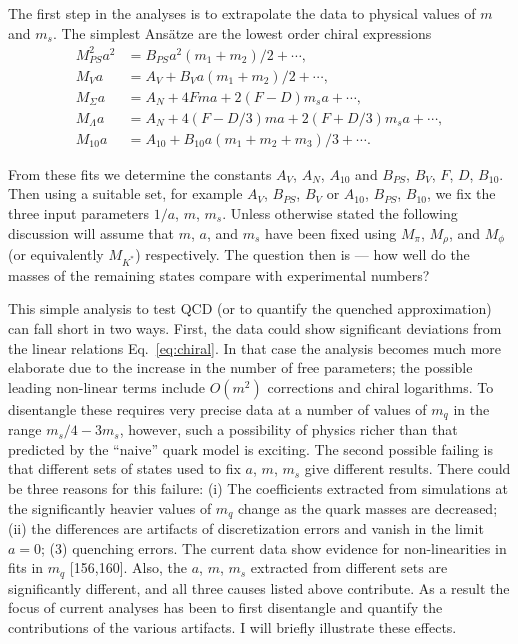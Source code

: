 The first step in the analyses is to extrapolate the data to physical values of $m$ and $m_s$. The simplest Ans\"atze are the lowest order chiral expressions
\begin{equation}
\begin{aligned}
M_{PS}^2 a^2 &= B_{PS} a^2 (m_1 + m_2)/2 + \cdots, \\
M_V a &= A_V + B_V a (m_1 + m_2)/2 + \cdots, \\
M_\Sigma a &= A_N + 4F m a + 2(F - D) m_s a + \cdots, \\
M_\Lambda a &= A_N + 4(F - D/3) m a + 2(F + D/3) m_s a + \cdots, \\
M_{10} a &= A_{10} + B_{10} a (m_1 + m_2 + m_3)/3 + \cdots.
\end{aligned}
\label{eq:chiral}
\end{equation}

From these fits we determine the constants $A_V$, $A_N$, $A_{10}$ and $B_{PS}$, $B_V$, $F$, $D$, $B_{10}$. Then using a suitable set, for example $A_V$, $B_{PS}$, $B_V$ or $A_{10}$, $B_{PS}$, $B_{10}$, we fix the three input parameters $1/a$, $m$, $m_s$. Unless otherwise stated the following discussion will assume that $m$, $a$, and $m_s$ have been fixed using $M_\pi$, $M_\rho$, and $M_\phi$ (or equivalently $M_{K^*}$) respectively. The question then is --- how well do the masses of the remaining states compare with experimental numbers?

This simple analysis to test QCD (or to quantify the quenched approximation) can fall short in two ways. First, the data could show significant deviations from the linear relations Eq.~\eqref{eq:chiral}. In that case the analysis becomes much more elaborate due to the increase in the number of free parameters; the possible leading non-linear terms include $O(m^2)$ corrections and chiral logarithms. To disentangle these requires very precise data at a number of values of $m_q$ in the range $m_s/4 - 3m_s$, however, such a possibility of physics richer than that predicted by the ``naive'' quark model is exciting. The second possible failing is that different sets of states used to fix $a$, $m$, $m_s$ give different results. There could be three reasons for this failure: (i) The coefficients extracted from simulations at the significantly heavier values of $m_q$ change as the quark masses are decreased; (ii) the differences are artifacts of discretization errors and vanish in the limit $a = 0$; (3) quenching errors. The current data show evidence for non-linearities in fits in $m_q$ [156,160]. Also, the $a$, $m$, $m_s$ extracted from different sets are significantly different, and all three causes listed above contribute. As a result the focus of current analyses has been to first disentangle and quantify the contributions of the various artifacts. I will briefly illustrate these effects.

